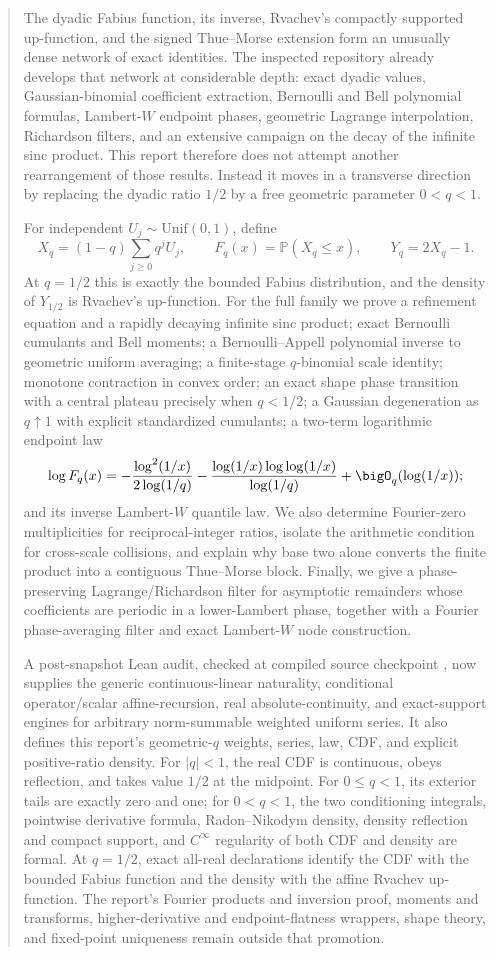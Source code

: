 \documentclass[11pt]{article}
\numberwithin{equation}{section}
\theoremstyle{definition}
\theoremstyle{remark}
\newcommand{\Prob}{\mathbb P}
\begin{document}
\begin{abstract}
The dyadic Fabius function, its inverse, Rvachev's compactly supported up-function,
and the signed Thue--Morse extension form an unusually dense network of exact identities.
The inspected repository already develops that network at considerable depth: exact dyadic
values, Gaussian-binomial coefficient extraction, Bernoulli and Bell polynomial formulas,
Lambert-$W$ endpoint phases, geometric Lagrange interpolation, Richardson filters, and an
extensive campaign on the decay of the infinite sinc product.  This report therefore does
not attempt another rearrangement of those results.  Instead it moves in a transverse
direction by replacing the dyadic ratio $1/2$ by a free geometric parameter $0<q<1$.

For independent $U_j\sim\mathrm{Unif}(0,1)$, define
\[
 X_q=(1-q)\sum_{j\ge0}q^jU_j,
 \qquad F_q(x)=\Prob(X_q\le x),
 \qquad Y_q=2X_q-1.
\]
At $q=1/2$ this is exactly the bounded Fabius distribution, and the density of $Y_{1/2}$
is Rvachev's up-function.  For the full family we prove a refinement equation and a
rapidly decaying infinite sinc product; exact Bernoulli cumulants and Bell moments; a
Bernoulli--Appell polynomial inverse to geometric uniform averaging; a finite-stage
$q$-binomial scale identity; monotone contraction in convex order; an exact shape phase
transition with a central plateau precisely when $q<1/2$; a Gaussian degeneration as
$q\uparrow1$ with explicit standardized cumulants; a two-term logarithmic endpoint law
\[
 \log F_q(x)
 =-\frac{\log^2(1/x)}{2\log(1/q)}
  -\frac{\log(1/x)\log\log(1/x)}{\log(1/q)}
  +\bigO_q(\log(1/x));
\]
and its inverse Lambert-$W$ quantile law.  We also determine Fourier-zero multiplicities
for reciprocal-integer ratios, isolate the arithmetic condition for cross-scale collisions,
and explain why base two alone converts the finite product into a contiguous Thue--Morse
block.  Finally, we give a phase-preserving Lagrange/Richardson filter for asymptotic
remainders whose coefficients are periodic in a lower-Lambert phase, together with a
Fourier phase-averaging filter and exact Lambert-$W$ node construction.

A post-snapshot Lean audit, checked at compiled source checkpoint
, now supplies the generic continuous-linear naturality,
conditional operator/scalar affine-recursion, real absolute-continuity, and exact-support
engines for arbitrary norm-summable weighted uniform series.  It also defines this report's
geometric-\(q\) weights, series, law, CDF, and explicit positive-ratio density.  For
\(|q|<1\), the real CDF is continuous, obeys reflection, and takes value \(1/2\) at the
midpoint.  For \(0\le q<1\), its exterior tails are exactly zero and one; for \(0<q<1\),
the two conditioning integrals, pointwise derivative formula, Radon--Nikodym density,
density reflection and compact support, and \(C^\infty\) regularity of both CDF and density
are formal.  At \(q=1/2\), exact all-real declarations identify the CDF with the bounded
Fabius function and the density with the affine Rvachev up-function.  The report's Fourier
products and inversion proof, moments and transforms, higher-derivative and endpoint-flatness
wrappers, shape theory, and fixed-point uniqueness remain outside that promotion.


\end{abstract}
\end{document}
